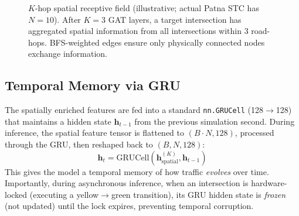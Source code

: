 \documentclass[12pt, onecolumn]{IEEEtran}
\begin{document}
\begin{figure}[H]
\caption{$K$-hop spatial receptive field (illustrative; actual Patna STC has $N{=}10$). After $K{=}3$ GAT layers,
a target intersection has aggregated spatial information from all
intersections within 3 road-hops. BFS-weighted edges ensure only
physically connected nodes exchange information.}
\label{fig:khop}
\end{figure}

\subsection{Temporal Memory via GRU}
The spatially enriched features are fed into a standard \texttt{nn.GRUCell} (128$\to$128) that maintains a hidden state $\mathbf{h}_{t-1}$ from the previous simulation second. During inference, the spatial feature tensor is flattened to $(B{\cdot}N, 128)$, processed through the GRU, then reshaped back to $(B, N, 128)$:
\begin{equation}
    \mathbf{h}_t = \text{GRUCell}(\mathbf{h}^{(K)}_{\text{spatial}}, \mathbf{h}_{t-1})
\end{equation}
This gives the model a temporal memory of how traffic \textit{evolves} over time. Importantly, during asynchronous inference, when an intersection is hardware-locked (executing a yellow$\to$green transition), its GRU hidden state is \textit{frozen} (not updated) until the lock expires, preventing temporal corruption.
\end{document}
